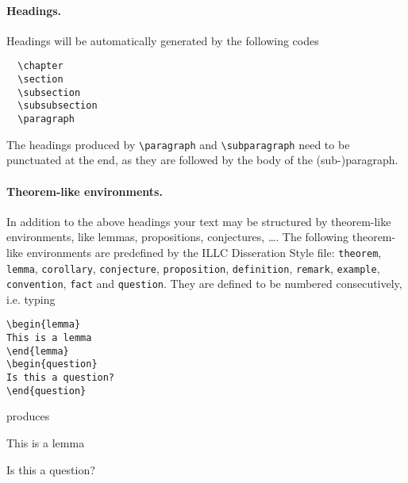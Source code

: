 \paragraph*{Headings.}
Headings will be automatically generated by the following codes
\begin{verbatim}
  \chapter
  \section
  \subsection
  \subsubsection
  \paragraph
\end{verbatim}
The headings produced by \verb|\paragraph| and \verb|\subparagraph| 
need to be punctuated at the end,
as they are followed by the body of the (sub-)paragraph.

\paragraph*{Theorem-like environments.}
In addition to the above headings your text may be structured 
by theorem-like environments, like lemmas, propositions, conjectures, \ldots .
The following theorem-like environments are predefined by the ILLC Disseration 
Style file: \verb|theorem|, \verb|lemma|, \verb|corollary|, \verb|conjecture|, 
\verb|proposition|, \verb|definition|, \verb|remark|, 
\verb|example|, \verb|convention|, \verb|fact| and \verb|question|.
They are defined to be numbered consecutively, i.e. typing
\begin{verbatim}
\begin{lemma}
This is a lemma
\end{lemma}
\begin{question}
Is this a question?
\end{question}
\end{verbatim}
produces
\begin{lemma}
This is a lemma
\end{lemma}
\begin{question}
Is this a question?
\end{question}

